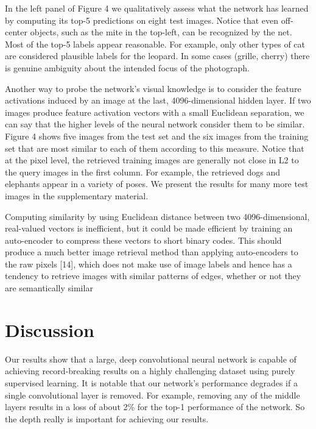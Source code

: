 \documentclass[12pt,a4paper,UTF8,twoside]{book}
\begin{document}
In the left panel of Figure 4 we qualitatively assess what the network has learned by computing its top-5 predictions on eight test images. Notice that even off-center objects, such as the mite in the top-left, can be recognized by the net. Most of the top-5 labels appear reasonable. For example, only other types of cat are considered plausible labels for the leopard. In some cases (grille, cherry) there is genuine ambiguity about the intended focus of the photograph.

Another way to probe the network's visual knowledge is to consider the feature activations induced by an image at the last, 4096-dimensional hidden layer. If two images produce feature activation vectors with a small Euclidean separation, we can say that the higher levels of the neural network consider them to be similar. Figure 4 shows five images from the test set and the six images from the training set that are most similar to each of them according to this measure. Notice that at the pixel level, the retrieved training images are generally not close in L2 to the query images in the first column. For example, the retrieved dogs and elephants appear in a variety of poses. We present the results for many more test images in the supplementary material.

Computing similarity by using Euclidean distance between two 4096-dimensional, real-valued vectors is inefficient, but it could be made efficient by training an auto-encoder to compress these vectors to short binary codes. This should produce a much better image retrieval method than applying auto-encoders to the raw pixels {[}14{]}, which does not make use of image labels and hence has a tendency to retrieve images with similar patterns of edges, whether or not they are semantically similar

\hypertarget{discussion}{%
\section{Discussion}\label{discussion}}

Our results show that a large, deep convolutional neural network is capable of achieving record-breaking results on a highly challenging dataset using purely supervised learning. It is notable that our network's performance degrades if a single convolutional layer is removed. For example, removing any of the middle layers results in a loss of about 2\% for the top-1 performance of the network. So the depth really is important for achieving our results.
\end{document}
